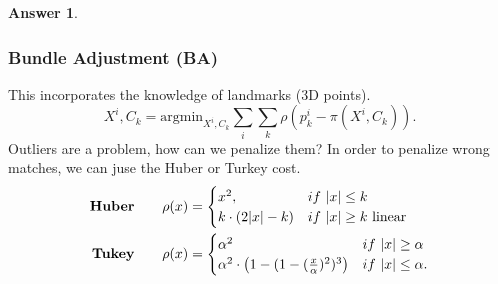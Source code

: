\documentclass[a4paper,12 pt]{article}
\theoremstyle{definition}
\theoremstyle{remark}
\theoremstyle{definition}
\theoremstyle{definition}
\theoremstyle{definition}
\theoremstyle{definition}
\theoremstyle{remark}
\theoremstyle{remark}
\theoremstyle{definition}
\theoremstyle{definition}
\newtheorem*{answer}{Answer}
\begin{document}
\begin{enumerate}
\begin{enumerate}
\begin{answer}
\subsubsection*{Bundle Adjustment (BA)}
This incorporates the knowledge of landmarks (3D points).  
\begin{equation}
X^i,C_k=\text{argmin}_{X^i,C_k} \sum_{i} \sum_{k}\rho \left( p_k^i-\pi(X^i,C_k)\right).
\end{equation}
Outliers are a problem, how can we penalize them? In order to penalize wrong matches, we can juse the Huber or Turkey cost.
\begin{equation}
\begin{split}
\text{\textbf{Huber}} \qquad \rho(x)&=\begin{cases}
x^2, &if \ |x|\leq k\\
k\cdot (2|x|-k)& if \ |x| \geq k \text{ linear}
\end{cases}\\
\text{\textbf{Tukey}} \qquad \rho(x)&=\begin{cases}
\alpha^2&if \ |x|\geq \alpha \\
\alpha^2 \cdot \left(1-(1-(\frac{x}{\alpha})^2)^3 \right)&if \ |x|\leq \alpha.
\end{cases}
\end{split}
\end{equation}


\end{answer}
\end{enumerate}
\end{enumerate}
\end{document}
